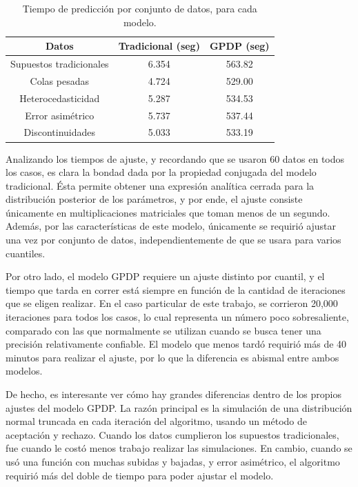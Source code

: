 \begin{table}[H]
\centering
\caption{Tiempo de predicción por conjunto de datos, para cada modelo.} 
\begin{tabular}{ccc}
  \hline
Datos & Tradicional (seg) & GPDP (seg) \\ 
  \hline
Supuestos tradicionales & 6.354 & 563.82 \\ 
  Colas pesadas & 4.724 & 529.00 \\ 
  Heterocedasticidad & 5.287 & 534.53 \\ 
  Error asimétrico & 5.737 & 537.44 \\ 
  Discontinuidades & 5.033 & 533.19 \\ 
   \hline
\end{tabular}
\label{pred_time}
\end{table}

Analizando los tiempos de ajuste, y recordando que se usaron 60 datos en todos los casos, es clara la bondad dada por la propiedad conjugada del modelo tradicional. \'Esta permite obtener una expresi\'on anal\'itica cerrada para la distribuci\'on posterior de los par\'ametros, y por ende, el ajuste consiste \'unicamente en multiplicaciones matriciales que toman menos de un segundo. Adem\'as, por las caracter\'isticas de este modelo, \'unicamente se requiri\'o ajustar una vez por conjunto de datos, independientemente de que se usara para varios cuantiles.

Por otro lado, el modelo GPDP requiere un ajuste distinto por cuantil, y el tiempo que tarda en correr est\'a siempre en funci\'on de la cantidad de iteraciones que se eligen realizar. En el caso particular de este trabajo, se corrieron 20,000 iteraciones para todos los casos, lo cual representa un n\'umero poco sobresaliente, comparado con las que normalmente se utilizan cuando se busca tener una precisi\'on relativamente confiable. El modelo que menos tard\'o requiri\'o m\'as de 40 minutos para realizar el ajuste, por lo que la diferencia es abismal entre ambos modelos.

De hecho, es interesante ver c\'omo hay grandes diferencias dentro de los propios ajustes del modelo GPDP. La raz\'on principal es la simulaci\'on de una distribuci\'on normal truncada en cada iteraci\'on del algoritmo, usando un m\'etodo de aceptaci\'on y rechazo. Cuando los datos cumplieron los supuestos tradicionales, fue cuando le cost\'o menos trabajo realizar las simulaciones. En cambio, cuando se us\'o una funci\'on con muchas subidas y bajadas, y error asim\'etrico, el algoritmo requiri\'o m\'as del doble de tiempo para poder ajustar el modelo.

